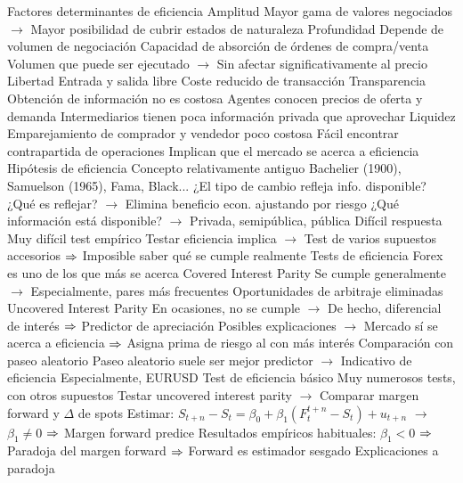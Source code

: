 \documentclass{nuevotema}
\begin{document}
\begin{esquemal}
			\3 Factores determinantes de eficiencia
				\4 Amplitud
				\4[] Mayor gama de valores negociados
				\4[] $\to$ Mayor posibilidad de cubrir estados de naturaleza
				\4 Profundidad
				\4[] Depende de volumen de negociación
				\4[] Capacidad de absorción de órdenes de compra/venta
				\4[] Volumen que puede ser ejecutado
				\4[] $\to$ Sin afectar significativamente al precio
				\4 Libertad
				\4[] Entrada y salida libre
				\4[] Coste reducido de transacción
				\4 Transparencia
				\4[] Obtención de información no es costosa
				\4[] Agentes conocen precios de oferta y demanda
				\4[] Intermediarios tienen poca información privada que aprovechar
				\4 Liquidez
				\4[] Emparejamiento de comprador y vendedor poco costosa
				\4[] Fácil encontrar contrapartida de operaciones
				\4[$\then$] Implican que el mercado se acerca a eficiencia
			\3 Hipótesis de eficiencia
				\4 Concepto relativamente antiguo
				\4[] Bachelier (1900), Samuelson (1965),
				\4[] Fama, Black...
				\4 ¿El tipo de cambio refleja info. disponible?
				\4[] ¿Qué es reflejar?
				\4[] $\to$ Elimina beneficio econ. ajustando por riesgo
				\4[] ¿Qué información está disponible?
				\4[] $\to$ Privada, semipública, pública
				\4 Difícil respuesta
				\4[] Muy difícil test empírico
				\4[] Testar eficiencia implica
				\4[] $\to$ Test de varios supuestos accesorios
				\4[] $\then$ Imposible saber qué se cumple realmente
			\3 Tests de eficiencia
				\4 Forex es uno de los que más se acerca
				\4 Covered Interest Parity
				\4[] Se cumple generalmente
				\4[] $\to$ Especialmente, pares más frecuentes
				\4[] Oportunidades de arbitraje eliminadas
				\4 Uncovered Interest Parity
				\4[] En ocasiones, no se cumple
				\4[] $\to$ De hecho, diferencial de interés
				\4[] $\then$ Predictor de apreciación
				\4[] Posibles explicaciones
				\4[] $\to$ Mercado sí se acerca a eficiencia
				\4[] $\then$ Asigna prima de riesgo al con más interés
				\4 Comparación con paseo aleatorio
				\4[] Paseo aleatorio suele ser mejor predictor
				\4[] $\to$ Indicativo de eficiencia
				\4[] Especialmente, EURUSD
				\4 Test de eficiencia básico
				\4[] Muy numerosos tests, con otros supuestos
				\4[] Testar uncovered interest parity
				\4[] $\to$ Comparar margen forward y $\Delta$ de spots
				\4[] Estimar: $S_{t+n} - S_t = \beta_0 + \beta_1 (F_t^{t+n} - S_t) + u_{t+n}$
				\4[] $\to$ $\beta_1 \neq 0$ $\then$ Margen forward predice
				\4[] Resultados empíricos habituales: $\beta_1 < 0$
				\4[] $\then$ Paradoja del margen forward
				\4[] $\then$ Forward es estimador sesgado
				\4 Explicaciones a paradoja

\end{esquemal}
\end{document}

